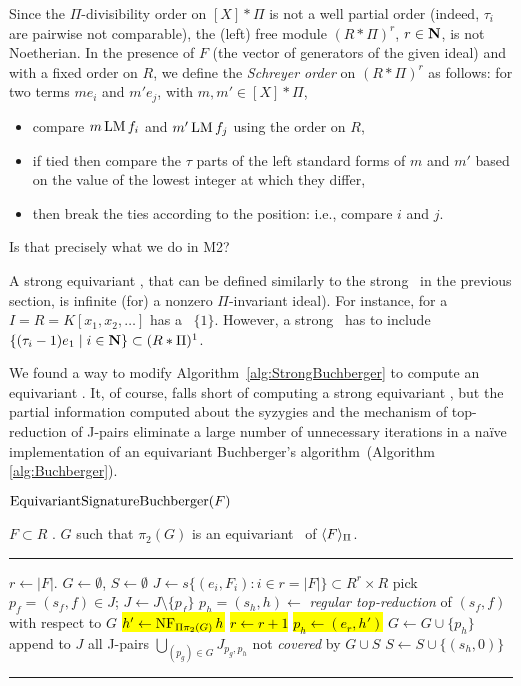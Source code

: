 Since the $\Pi$-divisibility order on $[X]*\Pi$ is not a well partial order (indeed, $\tau_i$ are pairwise not comparable), the (left) free module $(R*\Pi)^r$, $r\in\mathbf N$, is not Noetherian.  
In the presence of $F$ (the vector of generators of the given ideal) and with a fixed order on $R$, we define the \emph{Schreyer order} on $(R*\Pi)^r$ as follows: for two terms $me_i$ and $m'e_j$, with $m,m'\in [X]*\Pi$,
\begin{itemize}
\item compare $m\operatorname{LM} f_i$ and $m'\operatorname{LM} f_j$ using the order on $R$, 
\item if tied then compare the $\tau$ parts of the left standard forms of $m$ and $m'$ based on the value of the lowest integer at which they differ, 
\item then break the ties according to the position: i.e., compare $i$ and $j$.
\end{itemize}
{\color{red} Is that precisely what we do in M2?}

A strong equivariant \GB, that can be defined similarly to the strong \GB\ in the previous section, is infinite (for) a nonzero $\Pi$-invariant ideal). 
For instance, for a $I = R = K[x_1,x_2,\ldots]$ has a \GB\ $\{1\}$.
However, a strong \GB\ has to include $\{(\tau_i-1)e_1 \mid i\in\mathbf N \} \subset (R*\Pi)^1$. 

We found a way to modify Algorithm~\ref{alg:StrongBuchberger} to compute an equivariant \GB.  It, of course, falls short of computing a strong equivariant \GB, but the partial information computed about the syzygies and the mechanism of top-reduction of J-pairs eliminate a large number of unnecessary iterations in a na\"ive implementation of an equivariant Buchberger's algorithm~(Algorithm \ref{alg:Buchberger}).

\begin{algorithm}\label{alg:egb-signature}
$\operatorname{EquivariantSignatureBuchberger}(F)$

\begin{algorithmic}[1]
\REQUIRE $F\subset R$ .
\ENSURE $G$ such that $\pi_2(G)$ is an equivariant \GB\ of $\langle F \rangle_\Pi$.
\smallskip \hrule \smallskip
\STATE $r\gets |F|$.
\STATE $G\gets \emptyset$, $S\gets \emptyset$ 
\STATE $J\gets s\{(e_i,F_i):i\in r=|F|\} \subset R^r\times R$ 
	\STATE pick $p_f = (s_f,f) \in J$; $J\gets J\setminus\{p_f\}$
	\STATE $p_h=(s_h,h) \gets$ {\em regular top-reduction} of $(s_f,f)$ with respect to $G$
		\STATE \hl{$h' \gets\operatorname{NF}_{\Pi\pi_2(G)} h$}
				\STATE \hl{$r\gets r+1$}
				\STATE \hl{$p_h \gets (e_r,h')$}
			\ENDIF
			\STATE $G\gets G\cup \{p_h\}$
			\STATE append to $J$ all J-pairs $\bigcup_{(p_g)\in G}J_{p_g,p_h}$ not {\em covered} by $G \cup S$ 
		\ENDIF
        \ELSE 
                \STATE $S\gets S\cup\{(s_h,0)\}$
	\ENDIF
\ENDWHILE
\smallskip \hrule \smallskip
\end{algorithmic}
\end{algorithm}

